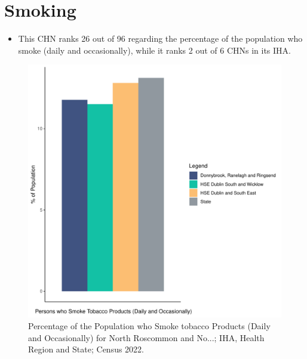 \documentclass{article}
\begin{document}
\pagebreak

\section{Smoking}\label{sect:Smoking}
\begin{itemize}
\item This CHN ranks  26 out of 96 regarding the percentage of the population who smoke (daily and occasionally), while it ranks   2 out of 6 CHNs in its IHA.
\end{itemize}
\begin{figure}[H]
	\centering
	\includegraphics[width = 120mm]{../figures/SmokingED.pdf}
	\caption{Percentage of the Population who Smoke tobacco Products (Daily and Occasionally) for North Roscommon and No...; IHA, Health Region and State; Census 2022.}
	\label{fig:2ae19629-1a6a-13a3-e055-000000000001}
	\end{figure}
	
\end{document}

